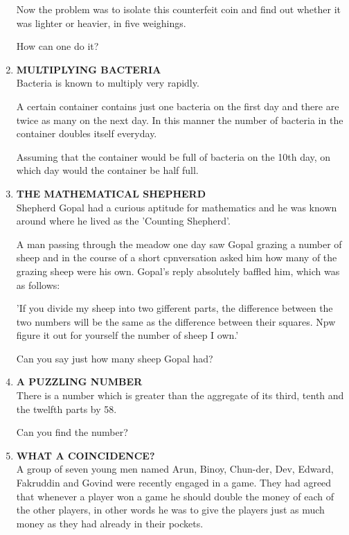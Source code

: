 \documentclass[12pt]{article}
\begin{document}
\begin{enumerate}
Now  the problem  was  to isolate  this  counterfeit  coin and find  out  whether  it was  lighter  or heavier,  in five weighings. 

How  can one do it? 

\item \textbf{MULTIPLYING  BACTERIA} \\
Bacteria  is known  to multiply  very  rapidly. 

A certain  container  contains  just  one bacteria  on the first day and there  are twice  as many  on the next  day.  In this manner  the number  of bacteria  in the  container doubles  itself  everyday. 

Assuming  that  the  container  would  be full of bacteria on the 10th  day,  on which  day  would  the  container  be half full. 


\item \textbf{THE  MATHEMATICAL  SHEPHERD} \\
Shepherd  Gopal  had  a curious  aptitude  for mathematics and he was known  around  where  he lived  as the 'Counting Shepherd'. 

A man  passing  through  the  meadow  one  day  saw Gopal  grazing  a number  of sheep  and in the course  of a short  cpnversation  asked  him  how  many  of the grazing sheep  were  his own.  Gopal's  reply  absolutely  baffled  him, which  was  as follows: 

'If you  divide  my sheep  into  two gifferent  parts,  the difference  between  the  two  numbers  will  be the same  as the difference  between  their  squares. Npw  figure  it out for yourself  the number  of sheep  I own.' 

Can you say just how  many  sheep  Gopal  had? 
%
\item \textbf{A PUZZLING  NUMBER} \\
There  is a number  which  is greater  than  the  aggregate  of its third,  tenth  and the twelfth  parts  by 58. 

Can you find  the number? 
%
\item \textbf{WHAT  A COINCIDENCE?} \\
A group  of seven  young  men  named  Arun,  Binoy,  Chun-der, Dev,  Edward,  Fakruddin  and  Govind  were  recently engaged  in a game.  They  had  agreed  that  whenever  a player  won  a game  he should  double  the money  of each of the  other  players,  in other  words  he was to give  the players  just as much  money  as they  had  already  in their pockets. 


\end{enumerate}
\end{document}
